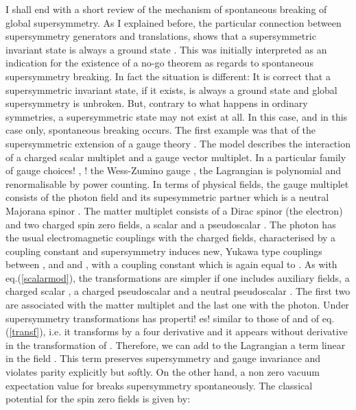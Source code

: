 \documentclass[a4paper,11pt]{article}
\begin{document}
I shall end with a short review of the mechanism of spontaneous  breaking of global supersymmetry. As I explained before, the particular connection between supersymmetry generators and translations, shows that a supersymmetric invariant state is always a ground state \cite{IZ}. This was initially interpreted as an indication for the existence of a no-go theorem as regards to spontaneous supersymmetry breaking. In fact the situation is different: It is correct that a supersymmetric invariant state, if it exists,  is always a ground state and global supersymmetry is unbroken. But, contrary to what happens in ordinary symmetries, a supersymmetric state may not exist at all. In this case, and in this case only, spontaneous breaking occurs. The first example \cite{FI} was that of the supersymmetric extension of a \coordHE{} gauge theory \cite{WZIII}. The model describes the interaction of a charged scalar multiplet and a gauge vector multiplet. In a particular family of gauge choices!
, !
the Wess-Zumino gauge \cite{WZII
I}, the Lagrangian is polynomial and renormalisable by power counting. In terms of physical fields, the gauge multiplet consists of the photon field \coordHE{} and its supesymmetric partner which is a neutral Majorana spinor \coordHE{}. The matter multiplet consists of a Dirac spinor \coordHE{} (the electron) and two charged spin zero fields, a scalar \coordHE{} and a pseudoscalar \coordHE{}. The photon has the usual electromagnetic couplings with the charged fields, characterised by a coupling constant \coordHE{} and  supersymmetry induces new, Yukawa type couplings between \myHighlight{$\lambda$}\coordHE{}, \myHighlight{$\psi$}\coordHE{} and \coordHE{} and \coordHE{},  with a coupling constant which is again equal to \coordHE{}. As with eq.(\ref{scalarmod}), the transformations are simpler if one includes auxiliary fields, a charged scalar \coordHE{}, a charged pseudoscalar \coordHE{} and a neutral  pseudoscalar \coordHE{}. The first two are associated with the matter multiplet and the last one with the photon. Under supersymmetry transformations \coordHE{} has properti!
es!
 similar to those of \coordHE{} and \coordHE{}
 of eq.(\ref{transf}), i.e. it transforms by a four derivative and it appears without derivative in the transformation of \myHighlight{$\lambda$}\coordHE{}. Therefore, we can add to the Lagrangian a term linear in the field \coordHE{}. This term preserves  supersymmetry and gauge invariance and violates parity explicitly but softly. On the other hand, a non zero vacuum expectation value for \coordHE{} breaks supersymmetry spontaneously. The classical potential for the spin zero fields is given by:
\end{document}
